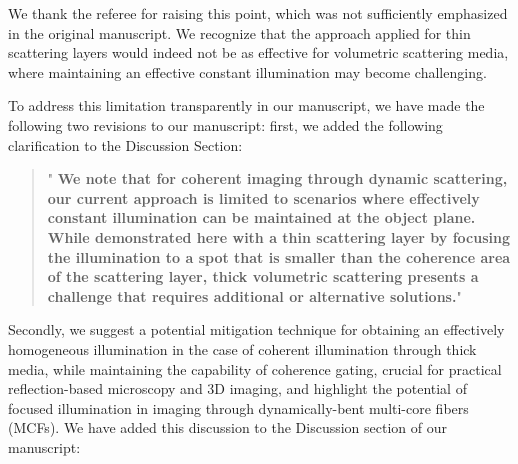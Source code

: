 \documentclass[12pt]{article}
\newenvironment{finished_ourresponse}
    {\begin{tcolorbox}[width=\linewidth,breakable,enhanced,colback=gray!5,colframe=finished_responsecolor!50,title=Response,left=5pt,right=5pt]}
    {\end{tcolorbox}}
\begin{document}
\begin{finished_ourresponse}
    We thank the referee for raising this point, which was not sufficiently emphasized in the original manuscript. 
    We recognize that the approach applied for thin scattering layers would indeed not be as effective for volumetric scattering media, where maintaining an effective constant illumination may become challenging.
    
    To address this limitation transparently in our manuscript, we have made the following two revisions to our manuscript: first, we added the following clarification to the Discussion Section:
    
    \begin{quote}
        "{\bfseries
        We note that for coherent imaging through dynamic scattering, our current approach is limited to scenarios where effectively constant illumination can be maintained at the object plane. While demonstrated here with a thin scattering layer by focusing the illumination to a spot that is smaller than the coherence area of the scattering layer, thick volumetric scattering presents a challenge that requires additional or alternative solutions.}"
    \end{quote}
    
     Secondly, we suggest a potential mitigation technique for obtaining an effectively homogeneous illumination in the case of coherent illumination through thick media, while maintaining the capability of coherence gating, crucial for practical reflection-based microscopy and 3D imaging, and highlight the potential of focused illumination in imaging through dynamically-bent multi-core fibers (MCFs). We have added this discussion to the Discussion section of our manuscript:

     \begin{quote}
     

\end{quote}
\end{finished_ourresponse}
\end{document}
